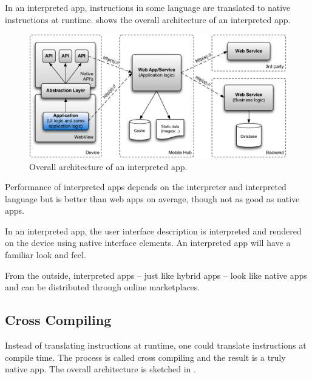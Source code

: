 In an interpreted app, instructions in some language are translated to native instructions at runtime.  shows the overall architecture of an interpreted app.

\begin{figure}[h!]
    \begin{center}
        \includegraphics[width=\textwidth]{figs/interpreted.pdf}
        \caption{
            Overall architecture of an interpreted app.
        }
        \label{fig:interpreted}
    \end{center}
\end{figure}

Performance of interpreted apps depends on the interpreter and interpreted language but is better than web apps on average, though not as good as native apps. 

In an interpreted app, the user interface description is interpreted and rendered on the device using native interface elements. An interpreted app will have a familiar look and feel.

From the outside, interpreted apps -- just like hybrid apps -- look like native apps and can be distributed through online marketplaces.

\subsection{Cross Compiling}

Instead of translating instructions at runtime, one could translate instructions at compile time. The process is called cross compiling and the result is a truly native app. The overall architecture is sketched in . 

